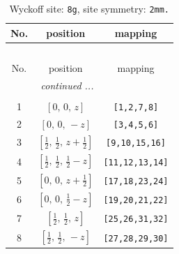 \documentclass[fleqn,8pt]{jsarticle}
\begin{document}
\begin{longtable}{ccc}
\caption{Wyckoff site: {\tt 8g}, site symmetry: {\tt 2mm.}}
 \\
 \hline \hline
No. & position & mapping \\ \hline \endfirsthead

\multicolumn{2}{l}{\tablename\ \thetable{}} \\
 \hline \hline
No. & position & mapping \\ \hline \endhead

 \hline \hline
\multicolumn{2}{r}{\footnotesize\it continued ...} \\ \endfoot

 \hline \hline
\multicolumn{2}{r}{} \\ \endlastfoot

1 & $\left[ 0,\, 0,\, z \right]$ & {\tt [1,2,7,8]} \\ \hline
2 & $\left[ 0,\, 0,\, - z \right]$ & {\tt [3,4,5,6]} \\ \hline
3 & $\left[ \frac{1}{2},\, \frac{1}{2},\, z + \frac{1}{2} \right]$ & {\tt [9,10,15,16]} \\ \hline
4 & $\left[ \frac{1}{2},\, \frac{1}{2},\, \frac{1}{2} - z \right]$ & {\tt [11,12,13,14]} \\ \hline
5 & $\left[ 0,\, 0,\, z + \frac{1}{2} \right]$ & {\tt [17,18,23,24]} \\ \hline
6 & $\left[ 0,\, 0,\, \frac{1}{2} - z \right]$ & {\tt [19,20,21,22]} \\ \hline
7 & $\left[ \frac{1}{2},\, \frac{1}{2},\, z \right]$ & {\tt [25,26,31,32]} \\ \hline
8 & $\left[ \frac{1}{2},\, \frac{1}{2},\, - z \right]$ & {\tt [27,28,29,30]} \\
\end{longtable}
\renewcommand{\arraystretch}{1.2}
\end{document}
